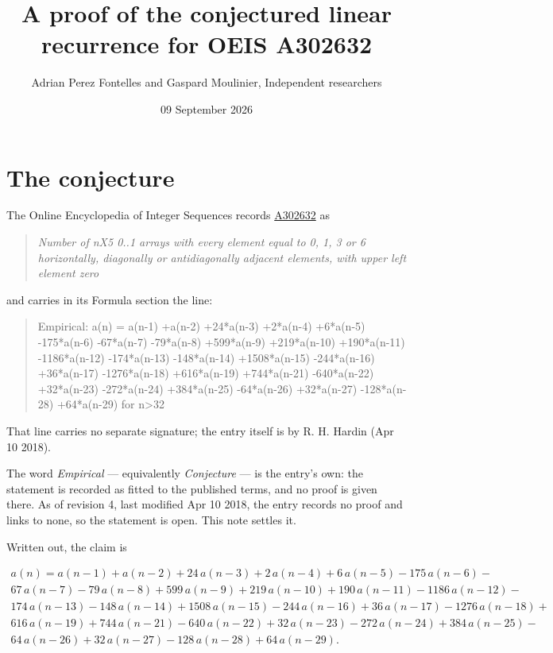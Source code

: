 \documentclass[11pt]{article}
\title{A proof of the conjectured linear recurrence for OEIS A302632}
\author{Adrian Perez Fontelles and Gaspard Moulinier, Independent researchers}
\date{09 September 2026}
\theoremstyle{definition}
\begin{document}
\maketitle
\section{The conjecture}

The Online Encyclopedia of Integer Sequences records \href{https://oeis.org/A302632}{A302632} as

\begin{quote}\itshape Number of nX5 0..1 arrays with every element equal to 0, 1, 3 or 6 horizontally, diagonally or antidiagonally adjacent elements, with upper left element zero\end{quote}

and carries in its Formula section the line:

\begin{quote}\ttfamily Empirical: a(n) = a(n-1) +a(n-2) +24*a(n-3) +2*a(n-4) +6*a(n-5) -175*a(n-6) -67*a(n-7) -79*a(n-8) +599*a(n-9) +219*a(n-10) +190*a(n-11) -1186*a(n-12) -174*a(n-13) -148*a(n-14) +1508*a(n-15) -244*a(n-16) +36*a(n-17) -1276*a(n-18) +616*a(n-19) +744*a(n-21) -640*a(n-22) +32*a(n-23) -272*a(n-24) +384*a(n-25) -64*a(n-26) +32*a(n-27) -128*a(n-28) +64*a(n-29) for n>32\end{quote}

That line carries no separate signature; the entry itself is by R. H. Hardin (Apr 10 2018).

The word {\itshape Empirical} --- equivalently {\itshape Conjecture} --- is the entry's own: the statement is recorded as fitted to the published terms, and no proof is given there. As of revision 4, last modified Apr 10 2018, the entry records no proof and links to none, so the statement is open. This note settles it.

Written out, the claim is

\begin{multline*} a(n) = a(n-1) + a(n-2) + 24\,a(n-3) + 2\,a(n-4) + 6\,a(n-5) - 175\,a(n-6) - \\ 67\,a(n-7) - 79\,a(n-8) + 599\,a(n-9) + 219\,a(n-10) + 190\,a(n-11) - 1186\,a(n-12) - \\ 174\,a(n-13) - 148\,a(n-14) + 1508\,a(n-15) - 244\,a(n-16) + 36\,a(n-17) - 1276\,a(n-18) + \\ 616\,a(n-19) + 744\,a(n-21) - 640\,a(n-22) + 32\,a(n-23) - 272\,a(n-24) + 384\,a(n-25) - \\ 64\,a(n-26) + 32\,a(n-27) - 128\,a(n-28) + 64\,a(n-29). \end{multline*}
\end{document}
